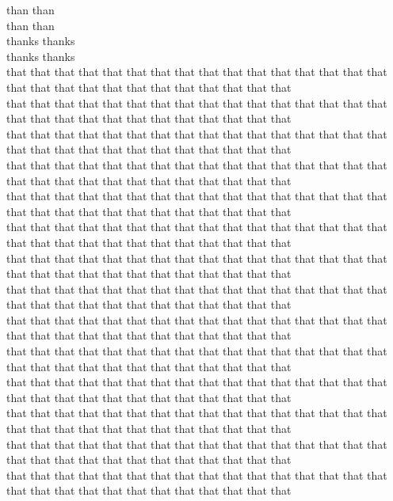 than than\\
than than\\
thanks thanks\\
thanks thanks\\
that that that that that that that that that that that that that that that that that that that that that that that that that that that that\\
that that that that that that that that that that that that that that that that that that that that that that that that that that that that\\
that that that that that that that that that that that that that that that that that that that that that that that that that that that that\\
that that that that that that that that that that that that that that that that that that that that that that that that that that that that\\
that that that that that that that that that that that that that that that that that that that that that that that that that that that that\\
that that that that that that that that that that that that that that that that that that that that that that that that that that that that\\
that that that that that that that that that that that that that that that that that that that that that that that that that that that that\\
that that that that that that that that that that that that that that that that that that that that that that that that that that that that\\
that that that that that that that that that that that that that that that that that that that that that that that that that that that that\\
that that that that that that that that that that that that that that that that that that that that that that that that that that that that\\
that that that that that that that that that that that that that that that that that that that that that that that that that that that that\\
that that that that that that that that that that that that that that that that that that that that that that that that that that that that\\
that that that that that that that that that that that that that that that that that that that that that that that that that that that that\\
that that that that that that that that that that that that that that that that that that that that that that that that that that that that\\
